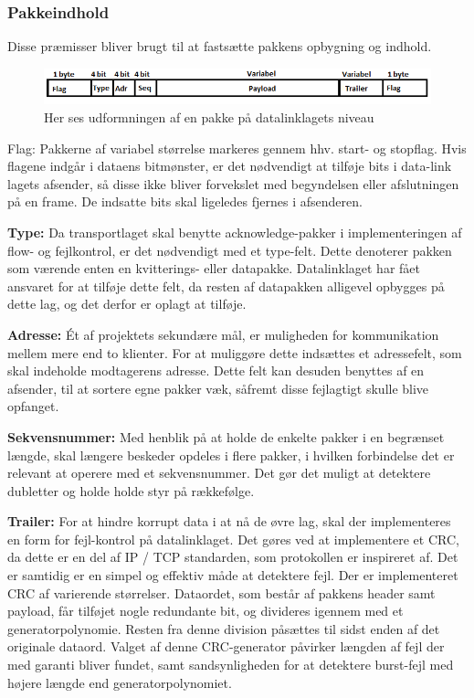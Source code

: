 \subsubsection{Pakkeindhold}
Disse præmisser bliver  brugt til at fastsætte pakkens opbygning og indhold.

\begin{figure}[h!]
\centering
\includegraphics[scale=0.8]{Billeder/DataLinkFrame.PNG}
\caption{Her ses udformningen af en pakke på datalinklagets niveau}
\label{fig:DataLinkFrame}
\end{figure}

Flag: Pakkerne af variabel størrelse markeres gennem hhv. start- og stopflag. Hvis flagene indgår i dataens bitmønster, er det nødvendigt at tilføje bits i data-link lagets afsender, så disse ikke bliver forvekslet med begyndelsen eller afslutningen på en frame. De indsatte bits skal ligeledes fjernes i afsenderen. 

\textbf{Type:} Da transportlaget skal benytte acknowledge-pakker i implementeringen af flow- og fejlkontrol, er det nødvendigt med et type-felt. Dette denoterer pakken som værende enten en kvitterings- eller datapakke. Datalinklaget har fået ansvaret for at tilføje dette felt, da resten af datapakken alligevel opbygges på dette lag, og det derfor er oplagt at tilføje.

\textbf{Adresse:} Ét af projektets sekundære mål, er muligheden for kommunikation mellem mere end to klienter. For at muliggøre dette indsættes et adressefelt, som skal indeholde modtagerens adresse. Dette felt kan desuden benyttes af en afsender, til at sortere egne pakker væk, såfremt disse fejlagtigt skulle blive opfanget.

\textbf{Sekvensnummer:} Med henblik på at holde de enkelte pakker i en begrænset længde, skal længere beskeder opdeles i flere pakker, i hvilken forbindelse det er relevant at operere med et sekvensnummer. Det gør det muligt at detektere dubletter og holde holde styr på rækkefølge.

\textbf{Trailer:} For at hindre korrupt data i at nå de øvre lag, skal der implementeres en form for fejl-kontrol på datalinklaget. Det gøres ved at implementere et CRC, da dette er en del af IP / TCP standarden, som protokollen er inspireret af. Det er samtidig er en simpel og effektiv måde at detektere fejl.
Der er implementeret CRC af varierende størrelser. Dataordet, som består af pakkens header samt payload, får tilføjet nogle redundante bit, og divideres igennem med et generatorpolynomie. Resten fra denne division påsættes til sidst enden af det originale dataord.	Valget af denne CRC-generator påvirker længden af fejl der med garanti bliver fundet, samt sandsynligheden for at detektere burst-fejl med højere længde end generatorpolynomiet.


